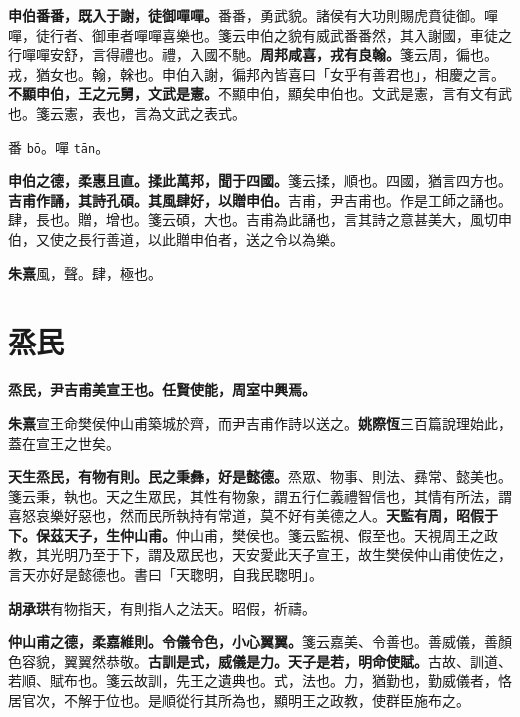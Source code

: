 \textbf{申伯番番，既入于謝，徒御嘽嘽。}{\footnotesize 番番，勇武貌。諸侯有大功則賜虎賁徒御。嘽嘽，徒行者、御車者嘽嘽喜樂也。箋云申伯之貌有威武番番然，其入謝國，車徒之行嘽嘽安舒，言得禮也。禮，入國不馳。}\textbf{周邦咸喜，戎有良翰。}{\footnotesize 箋云周，徧也。戎，猶女也。翰，榦也。申伯入謝，徧邦內皆喜曰「女乎有善君也」，相慶之言。}\textbf{不顯申伯，王之元舅，文武是憲。}{\footnotesize 不顯申伯，顯矣申伯也。文武是憲，言有文有武也。箋云憲，表也，言為文武之表式。}

\begin{quoting}番 \texttt{bō}。嘽 \texttt{tān}。\end{quoting}

\textbf{申伯之德，柔惠且直。揉此萬邦，聞于四國。}{\footnotesize 箋云揉，順也。四國，猶言四方也。}\textbf{吉甫作誦，其詩孔碩。其風肆好，以贈申伯。}{\footnotesize 吉甫，尹吉甫也。作是工師之誦也。肆，長也。贈，增也。箋云碩，大也。吉甫為此誦也，言其詩之意甚美大，風切申伯，又使之長行善道，以此贈申伯者，送之令以為樂。}

\begin{quoting}\textbf{朱熹}風，聲。肆，極也。\end{quoting}

\section{烝民}


\textbf{烝民，尹吉甫美宣王也。任賢使能，周室中興焉。}

\begin{quoting}\textbf{朱熹}宣王命樊侯仲山甫築城於齊，而尹吉甫作詩以送之。\textbf{姚際恆}三百篇說理始此，蓋在宣王之世矣。\end{quoting}

\textbf{天生烝民，有物有則。民之秉彝，好是懿德。}{\footnotesize 烝眾、物事、則法、彞常、懿美也。箋云秉，執也。天之生眾民，其性有物象，謂五行仁義禮智信也，其情有所法，謂喜怒哀樂好惡也，然而民所執持有常道，莫不好有美德之人。}\textbf{天監有周，昭假于下。保茲天子，生仲山甫。}{\footnotesize 仲山甫，樊侯也。箋云監視、假至也。天視周王之政教，其光明乃至于下，謂及眾民也，天安愛此天子宣王，故生樊侯仲山甫使佐之，言天亦好是懿德也。書曰「天聦明，自我民聦明」。}

\begin{quoting}\textbf{胡承珙}有物指天，有則指人之法天。昭假，祈禱。\end{quoting}

\textbf{仲山甫之德，柔嘉維則。令儀令色，小心翼翼。}{\footnotesize 箋云嘉美、令善也。善威儀，善顏色容貌，翼翼然恭敬。}\textbf{古訓是式，威儀是力。天子是若，明命使賦。}{\footnotesize 古故、訓道、若順、賦布也。箋云故訓，先王之遺典也。式，法也。力，猶勤也，勤威儀者，恪居官次，不解于位也。是順從行其所為也，顯明王之政教，使群臣施布之。}


